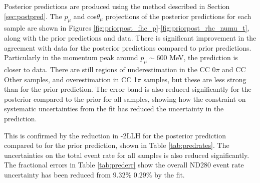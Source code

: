 Posterior predictions are produced using the method described in Section \ref{sec:postpred}. The $p_{\mu}$ and cos$\theta_{\mu}$ projections of the posterior predictions for each sample are shown in Figures \ref{fig:priorpost_fhc_p}-\ref{fig:priorpost_rhc_numu_t}, along with the prior predictions and data. There is significant improvement in the agreement with data for the posterior predictions compared to prior predictions. Particularly in the momentum peak around $p_{\mu}\sim$600 MeV, the prediction is closer to data. There are still regions of underestimation in the CC 0$\pi$ and CC Other samples, and overestimation in CC 1$\pi$ samples, but these are less strong than for the prior prediction. The error band is also reduced significantly for the posterior compared to the prior for all samples, showing how the constraint on systematic uncertainties from the fit has reduced the uncertainty in the prediction. 

This is confirmed by the reduction in -2LLH for the posterior prediction compared to for the prior prediction, shown in Table \ref{tab:predrates}. The uncertainties on the total event rate for all samples is also reduced significantly. The fractional errors in Table \ref{tab:prederr} show the overall ND280 event rate uncertainty has been reduced from $9.32\%$ $0.29\%$ by the fit.

